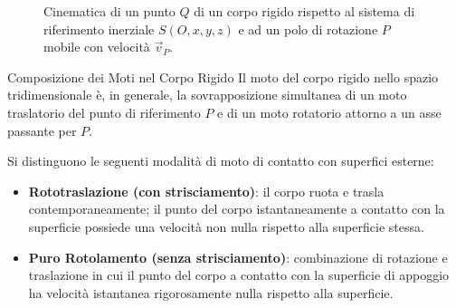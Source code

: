 \begin{figure}[ht]
    \centering
    \caption{Cinematica di un punto $Q$ di un corpo rigido rispetto al sistema di riferimento inerziale $S(O,x,y,z)$ e ad un polo di rotazione $P$ mobile con velocità $\vec{v}_P$.}
\end{figure}

\begin{osservazione}{Composizione dei Moti nel Corpo Rigido}
Il moto del corpo rigido nello spazio tridimensionale è, in generale, la sovrapposizione simultanea di un moto traslatorio del punto di riferimento $P$ e di un moto rotatorio attorno a un asse passante per $P$.
\end{osservazione}

Si distinguono le seguenti modalità di moto di contatto con superfici esterne:
\begin{itemize}
    \item \textbf{Rototraslazione (con strisciamento)}: il corpo ruota e trasla contemporaneamente; il punto del corpo istantaneamente a contatto con la superficie possiede una velocità non nulla rispetto alla superficie stessa.
    \item \textbf{Puro Rotolamento (senza strisciamento)}: combinazione di rotazione e traslazione in cui il punto del corpo a contatto con la superficie di appoggio ha velocità istantanea rigorosamente nulla rispetto alla superficie.
\end{itemize}

